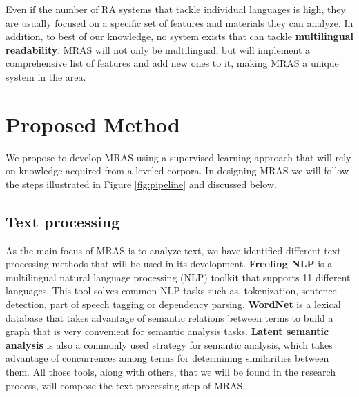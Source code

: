 \documentclass[12pt]{article}
\begin{document}
Even if the number of RA systems that tackle individual languages is high, they are usually focused on a specific set of features and materials they can analyze. In addition, to best of our knowledge, no system exists that can tackle \textbf{multilingual readability}. MRAS will not only be multilingual, but will implement a comprehensive list of features and add new ones to it, making MRAS a unique system in the area.




\section{Proposed Method}

We propose to develop MRAS using a supervised learning approach that will rely on knowledge acquired from a leveled corpora. In designing MRAS we will follow the steps illustrated in Figure \ref{fig:pipeline} and discussed below.


\subsection{Text processing}
As the main focus of MRAS is to analyze text, we have identified different text processing methods that will be used in its development. \textbf{Freeling NLP} \cite{padro12,padro10b} is a multilingual natural language processing (NLP) toolkit that supports 11 different languages. This tool solves common NLP tasks such as, tokenization, sentence detection, part of speech tagging or dependency parsing. \textbf{WordNet} is a lexical database that takes advantage of semantic relations between terms to build a graph that is very convenient for semantic analysis tasks. \textbf{Latent semantic analysis} is also a commonly used strategy  for semantic analysis, which takes advantage of concurrences among terms for determining similarities between them. All those tools, along with others, that we will be found in the research process, will compose the text processing step of MRAS.
\end{document}
